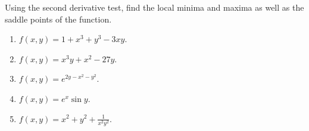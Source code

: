 Using the second derivative test, find the local minima and maxima as well as the saddle points of the function. 


\begin{enumerate}
\item $f(x,y)= 1+x^3+y^3-3x y$.   


\item $f(x,y)= x^3y+x^2-27y$.
\item $f(x,y)=e^{2y-x^2-y^2}$.
\item $f(x,y)=e^x\sin y$.
\item $f(x,y) =x^2+ y^2+ \frac{ 1}{ x^2y^2}$.
\end{enumerate}